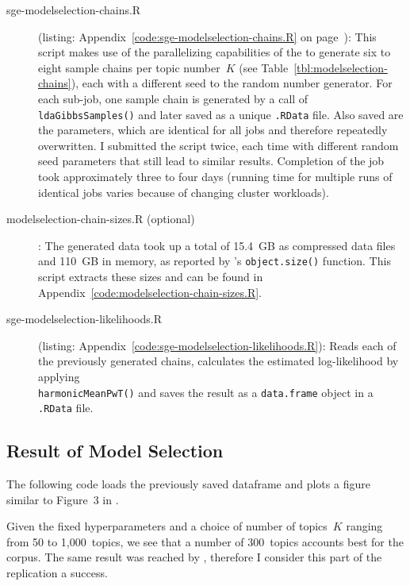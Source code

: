\begin{description}
  \item[sge-modelselection-chains.R] (listing: Appendix~\ref{code:sge-modelselection-chains.R} on page~\pageref{code:sge-modelselection-chains.R}): This script makes use of the parallelizing capabilities of the  to generate six to eight sample chains per topic number~$K$ (see Table~\ref{tbl:modelselection-chains}), each with a different seed to the random number generator. For each sub-job, one sample chain is generated by a call of \texttt{ldaGibbsSamples()} and later saved as a unique \texttt{.RData} file. Also saved are the parameters, which are identical for all jobs and therefore repeatedly overwritten. I submitted the script twice, each time with different random seed parameters that still lead to similar results. Completion of the job took approximately three to four days (running time for multiple runs of identical jobs varies because of changing cluster workloads). 

\item[modelselection-chain-sizes.R (optional)]: The generated data took up a total of 15.4~GB as compressed  data files and 110~GB in memory, as reported by 's \texttt{object.size()} function. This script extracts these sizes and can be found in Appendix~\ref{code:modelselection-chain-sizes.R}.

\item[sge-modelselection-likelihoods.R] (listing: Appendix~\ref{code:sge-modelselection-likelihoods.R}): Reads each of the previously generated chains, calculates the estimated log-likelihood by applying \\ \texttt{harmonicMeanPwT()} and saves the result as a \texttt{data.frame} object in a \texttt{.RData} file.
\end{description}


\subsection{Result of Model Selection}

The following  code loads the previously saved dataframe and plots a figure similar to Figure~3 in \citet{Griffiths2004}.



Given the fixed hyperparameters and a choice of number of topics~$K$ ranging from 50 to 1,000~topics, we see that a number of 300~topics accounts best for the corpus. The same result was reached by , therefore I consider this part of the replication a success.


